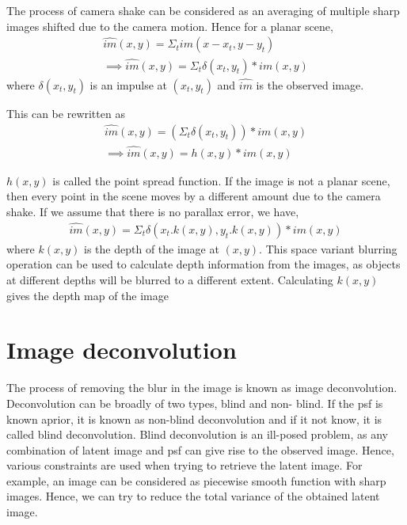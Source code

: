 \documentclass[BTech]{iitmdiss}
\begin{document}
The process of camera shake can be considered as an averaging of 
multiple sharp images shifted due to the camera motion. Hence for a 
planar scene, 
\begin{align*}
\hat{im}(x,y) = \Sigma_tim(x-x_t,y-y_t)\\
\implies\hat{im}(x,y) = \Sigma_t\delta(x_t, y_t)*im(x,y)
\end{align*}
where $\delta(x_t, y_t)$ is an impulse at $(x_t, y_t)$ and $\hat{im}$ is
the observed image.

This can be rewritten as
\begin{align*}
\hat{im}(x,y) = (\Sigma_t\delta(x_t, y_t))*im(x,y)\\
\implies \hat{im}(x,y) = h(x,y)*im(x,y)
\end{align*}

$h(x,y)$ is called the point spread function. If the image is not a 
planar scene, then every point in the scene moves by a different amount
due to the camera shake. If we assume that there is no parallax error,
we have,
\begin{align*}
\hat{im}(x,y) = \Sigma_t\delta(x_t.k(x,y), y_t.k(x,y))*im(x,y)
\end{align*}
where $k(x,y)$ is the depth of the image at $(x,y)$. This space variant
blurring operation can be used to calculate depth information from the 
images, as objects at different depths will be blurred to a different
extent. Calculating $k(x,y)$ gives the depth map of the image

\section{Image deconvolution}
\label{basic_theory:deconv}
The process of removing the blur in the image is known as image
deconvolution. Deconvolution can be broadly of two types, blind and non-
blind. If the psf is known aprior, it is known as non-blind 
deconvolution and if it not know, it is called blind deconvolution. 
Blind deconvolution is an ill-posed problem, as any combination of 
latent image and psf can give rise to the observed image. Hence, various
constraints are used when trying to retrieve the latent image. For 
example, an image can be considered as piecewise smooth function with
sharp images. Hence, we can try to reduce the total variance of the 
obtained latent image. %
\end{document}
